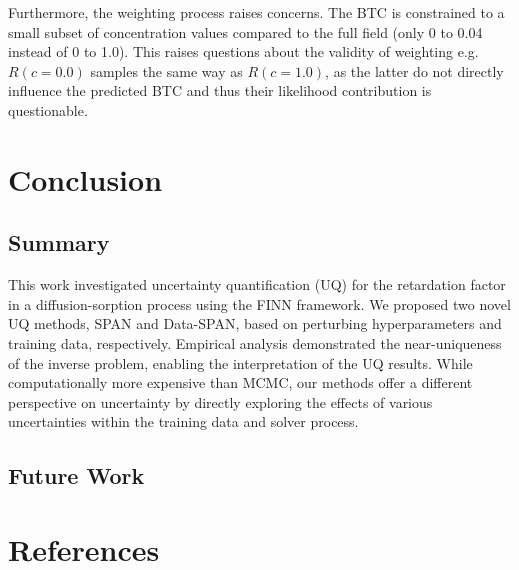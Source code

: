 \documentclass{article}
\begin{document}
Furthermore, the weighting process raises concerns. The BTC is constrained to a small subset of concentration values compared to the full field (only 0 to 0.04 instead of 0 to 1.0). This raises questions about the validity of weighting e.g. $R(c=0.0)$ samples the same way as $R(c=1.0)$, as the latter do not directly influence the predicted BTC and thus their likelihood contribution is questionable.


\section{Conclusion}
\subsection{Summary}
This work investigated uncertainty quantification (UQ) for the retardation factor in a diffusion-sorption process using the FINN framework. We proposed two novel UQ methods, SPAN and Data-SPAN, based on perturbing hyperparameters and training data, respectively. Empirical analysis demonstrated the near-uniqueness of the inverse problem, enabling the interpretation of the UQ results. While computationally more expensive than MCMC, our methods offer a different perspective on uncertainty by directly exploring the effects of various uncertainties within the training data and solver process.

\subsection{Future Work}


\section{References}
\printbibliography
\end{document}
